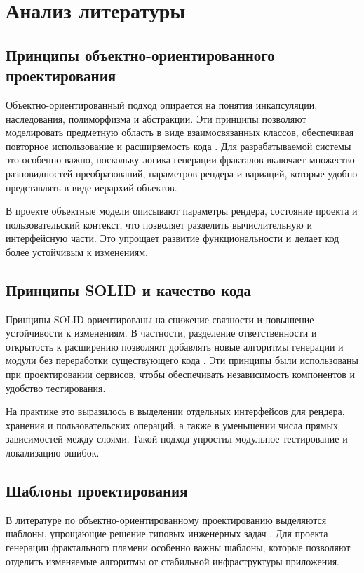 \newpage

\section{Анализ литературы}

\subsection{Принципы объектно-ориентированного проектирования}

Объектно-ориентированный подход опирается на понятия инкапсуляции, наследования, полиморфизма и абстракции. Эти принципы позволяют моделировать предметную область в виде взаимосвязанных классов, обеспечивая повторное использование и расширяемость кода \cite{ooaod_booch}. Для разрабатываемой системы это особенно важно, поскольку логика генерации фракталов включает множество разновидностей преобразований, параметров рендера и вариаций, которые удобно представлять в виде иерархий объектов.

В проекте объектные модели описывают параметры рендера, состояние проекта и пользовательский контекст, что позволяет разделить вычислительную и интерфейсную части. Это упрощает развитие функциональности и делает код более устойчивым к изменениям.

\subsection{Принципы SOLID и качество кода}

Принципы SOLID ориентированы на снижение связности и повышение устойчивости к изменениям. В частности, разделение ответственности и открытость к расширению позволяют добавлять новые алгоритмы генерации и модули без переработки существующего кода \cite{solid_martin}. Эти принципы были использованы при проектировании сервисов, чтобы обеспечивать независимость компонентов и удобство тестирования.

На практике это выразилось в выделении отдельных интерфейсов для рендера, хранения и пользовательских операций, а также в уменьшении числа прямых зависимостей между слоями. Такой подход упростил модульное тестирование и локализацию ошибок.

\subsection{Шаблоны проектирования}

В литературе по объектно-ориентированному проектированию выделяются шаблоны, упрощающие решение типовых инженерных задач \cite{design_patterns}. Для проекта генерации фрактального пламени особенно важны шаблоны, которые позволяют отделить изменяемые алгоритмы от стабильной инфраструктуры приложения.


